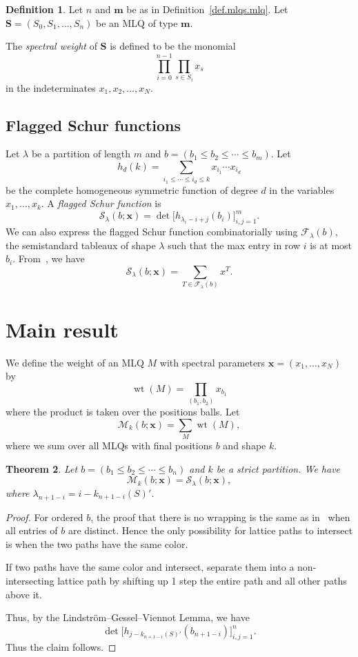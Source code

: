 \documentclass[reqno]{amsart}
\newcommand{\fs}{\mathcal{S}} %
\DeclareMathOperator{\wt}{wt} %
\newcommand{\xx}{\mathbf{x}}
\newcommand{\mm}{\mathbf{m}}
\newcommand{\MLQ}{\mathbf{S}}
\newcommand{\mcF}{\mathcal{F}}
\newcommand{\mcM}{\mathcal{M}}
\let\sumnonlimits\sum
\let\prodnonlimits\prod
\renewcommand{\sum}{\sumnonlimits\limits}
\renewcommand{\prod}{\prodnonlimits\limits}
\newcommand{\tup}[1]{\left( #1 \right)}
\newcommand{\defn}[1]{{\color{darkred}\emph{#1}}} %
\theoremstyle{plain}
\newtheorem{thm}{Theorem}[section]
\theoremstyle{definition}
\newtheorem{dfn}[thm]{Definition}
\numberwithin{equation}{section}
\begin{document}
\begin{dfn} \label{def.mlq.sw}
Let $n$ and $\mm$ be as in Definition~\ref{def.mlqs.mlq}.
Let $\MLQ = \tup{S_0, S_1, \ldots, S_n}$ be an MLQ of type $\mm$.

The \defn{spectral weight} of $\MLQ$ is defined to be the
monomial
\[
 \prod_{i=0}^{n-1} \prod_{s \in S_i} x_s
\]
in the indeterminates $x_1, x_2, \ldots, x_N$.
\end{dfn}


\subsection{Flagged Schur functions}

Let $\lambda$ be a partition of length $m$ and $b = (b_1 \leq b_2 \leq \cdots \leq b_m)$.
Let
\[
h_d(k) = \sum_{i_1 \leq \cdots \leq i_d \leq k} x_{i_1} \cdots x_{i_d}
\]
be the complete homogeneous symmetric function of degree $d$ in the variables $x_1, \dotsc, x_k$.
A \defn{flagged Schur function} is
\[
\fs_{\lambda}(b; \xx) = \det\big[ h_{\lambda_i - i + j}(b_i) \bigr]_{i,j=1}^m.
\]
We can also express the flagged Schur function combinatorially using $\mcF_{\lambda}(b)$, the semistandard tableaux of shape $\lambda$ such that the max entry in row $i$ is at most $b_i$.
From~\cite{Wachs85}, we have
\[
\fs_{\lambda}(b; \xx) = \sum_{T \in \mcF_{\lambda}(b)} x^T.
\]








\section{Main result}
\label{sec:result}

We define the weight of an MLQ $M$ with spectral parameters $\xx = (x_1, \dotsc, x_N)$ by
\[
\wt(M) = \prod_{(b_1,b_2)} x_{b_1}
\]
where the product is taken over the positions balls.
Let
\[
\mcM_k(b; \xx) = \sum_M \wt(M),
\]
where we sum over all MLQs with final positions $b$ and shape $k$.

\begin{thm}
Let $b = (b_1 \leq b_2 \leq \cdots \leq b_n)$ and $k$ be a strict partition.
We have
\[
\mcM_k(b; \xx) = \fs_{\lambda}(b; \xx),
\]
where $\lambda_{n+1-i} = i - k_{n+1-i}(S)'$.
\end{thm}

\begin{proof}
For ordered $b$, the proof that there is no wrapping is the same as in~\cite{AasLin17} when all entries of $b$ are distinct.
Hence the only possibility for lattice paths to intersect is when the two paths have the same color.

If two paths have the same color and intersect, separate them into a non-intersecting lattice path by shifting up 1 step the entire path and all other paths above it.

Thus, by the Lindstr\"om--Gessel--Viennot Lemma, we have
\[
\det\big[ h_{j-k_{n+1-i}(S)'}(b_{n+1-i}) \bigr]_{i,j=1}^n.
\]
Thus the claim follows.
\end{proof}
\end{document}
